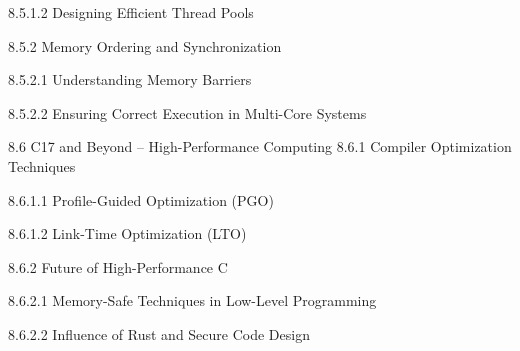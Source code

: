 8.5.1.2 Designing Efficient Thread Pools

8.5.2 Memory Ordering and Synchronization

8.5.2.1 Understanding Memory Barriers

8.5.2.2 Ensuring Correct Execution in Multi-Core Systems

8.6 C17 and Beyond – High-Performance Computing
8.6.1 Compiler Optimization Techniques

8.6.1.1 Profile-Guided Optimization (PGO)

8.6.1.2 Link-Time Optimization (LTO)

8.6.2 Future of High-Performance C

8.6.2.1 Memory-Safe Techniques in Low-Level Programming

8.6.2.2 Influence of Rust and Secure Code Design

